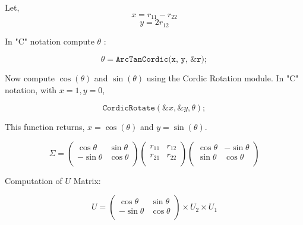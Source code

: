 Let,
\begin{equation}
x=r_{11}-r_{22}
\end{equation}
\begin{equation}
y=2r_{12}
\end{equation}

In "C" notation compute $\theta$ :

\begin{equation}\label{test}
  \theta=\texttt{ArcTanCordic(x, y, \&r)};
\end{equation}

Now compute $\cos(\theta)$ and $\sin (\theta) $ using the Cordic Rotation module. In "C" notation, with $x=1,y=0$,

\begin{equation}\label{test}
  \texttt{CordicRotate}(\&x, \&y, \theta);
\end{equation}

This function returns, $x=\cos(\theta)$ and $y=\sin (\theta)$.


\begin{equation}
\Sigma=\left(
     \begin{array}{cc}
       \cos \theta   & \sin \theta \\
      - \sin \theta & \cos \theta  \\
     \end{array}
   \right)
\left(
     \begin{array}{cc}
       r_{11}  & r_{12} \\
      r_{21} & r_{22} \\
     \end{array}
   \right)
\left(
      \begin{array}{cc}
       \cos \theta   & -\sin \theta \\
        \sin \theta & \cos \theta  \\
     \end{array}
   \right)
\end{equation}

Computation of $U$ Matrix:

\begin{equation}
U=\left(
     \begin{array}{cc}
       \cos \theta   & \sin \theta \\
      - \sin \theta & \cos \theta  \\
     \end{array}
   \right)
   \times U_2 \times U_1
\end{equation}


